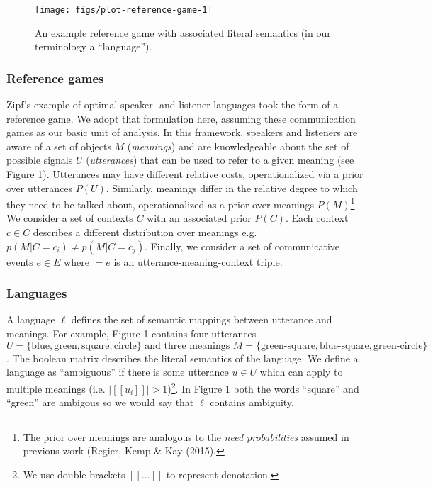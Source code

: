 \documentclass[10pt, letterpaper]{article}
\newenvironment{CodeChunk}{}{}
\begin{document}
\begin{CodeChunk}
\begin{figure}[H]

{\centering \texttt{[image: figs/plot-reference-game-1]} 

}

\caption[An example reference game with associated literal semantics (in our terminology a ``language'')]{An example reference game with associated literal semantics (in our terminology a ``language'').}\label{fig:plot-reference-game}
\end{figure}
\end{CodeChunk}

\subsubsection{Reference games}\label{reference-games}

Zipf's example of optimal speaker- and listener-languages took the form
of a reference game. We adopt that formulation here, assuming these
communication games as our basic unit of analysis. In this framework,
speakers and listeners are aware of a set of objects \(M\)
(\emph{meanings}) and are knowledgeable about the set of possible
signals \(U\) (\emph{utterances}) that can be used to refer to a given
meaning (see Figure 1). Utterances may have different relative costs,
operationalized via a prior over utterances \(P(U)\). Similarly,
meanings differ in the relative degree to which they need to be talked
about, operationalized as a prior over meanings
\(P(M)\)\footnote{The prior over meanings are analogous to the \textit{need probabilities} assumed in previous work (Regier, Kemp \& Kay (2015).}.
We consider a set of contexts \(C\) with an associated prior \(P(C)\).
Each context \(c\in C\) describes a different distribution over meanings
e.g. \(p(M|C=c_i) \neq p(M|C=c_j)\). Finally, we consider a set of
communicative events \(e \in E\) where \(<u, m, c> = e\) is an
utterance-meaning-context triple.\par

\subsubsection{Languages}\label{languages}

A language \(\ell\) defines the set of semantic mappings between
utterance and meanings. For example, Figure 1 contains four utterances
\(U = \{\text{blue}, \text{green}, \text{square}, \text{circle}\} \text{ and three meanings }M = \{\text{green-square}, \text{blue-square}, \text{green-circle}\}\).
The boolean matrix describes the literal semantics of the language. We
define a language as ``ambiguous'' if there is some utterance
\(u \in U\) which can apply to multiple meanings (i.e.
\(|[[u_i]]| > 1\))\footnote{We use double brackets $[[\dots]]$ to represent denotation.}.
In Figure 1 both the words ``square'' and ``green'' are ambigous so we
would say that \(\ell\) contains ambiguity.
\end{document}
